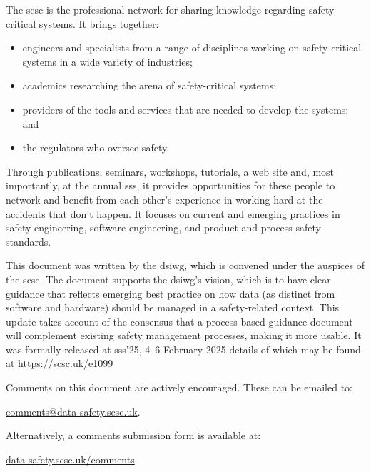 The \gls{scsc} is the professional network for sharing knowledge regarding safety-critical systems. It brings together: 
\begin{itemize}
	\item engineers and specialists from a range of disciplines working on safety-critical systems in a wide variety of industries;
	\item academics researching the arena of safety-critical systems;
	\item providers of the tools and services that are needed to develop the systems; and
	\item the regulators who oversee safety.
\end{itemize}

Through publications, seminars, workshops, tutorials, a web site and, most importantly, at the annual \gls{sss}, it provides opportunities for these people to network and benefit from each other’s experience in working hard at the accidents that don’t happen. It focuses on current and emerging practices in safety engineering, software engineering, and product and process safety standards.

This document was written by the \gls{dsiwg}, which is convened under the auspices of the \gls{scsc}. The document supports the \gls{dsiwg}'s vision, which is to have clear guidance that reflects emerging best practice on how data (as distinct from software and hardware) should be managed in a safety-related context. This update takes account of the consensus that a process-based guidance document will complement existing safety management processes, making it more usable. It was formally released at
\gls{sss}'25, 4--6 February 2025
details of which may be found at
\href{https://scsc.uk/e1099}{https://scsc.uk/e1099}%

Comments on this document are actively encouraged. These can be emailed to: 
\begin{center}
  \href{mailto:comments@data-safety.scsc.uk}{comments@data-safety.scsc.uk}.
\end{center}

Alternatively, a comments submission form is available at:
\begin{center}
  \href{http://scsc.uk/data-comments.html}{data-safety.scsc.uk/comments}.
\end{center}

